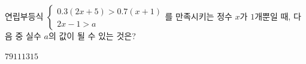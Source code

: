 연립부등식 $\begin{cases} 0.3(2x+5)>0.7(x+1) \\ 2x-1>a \end{cases}$를 만족시키는 정수 $x$가 $1$개뿐일 때, 다음 중 실수 $a$의 값이 될 수 있는 것은?
\begin{choices32}{$7$}{$9$}{$11$}{$13$}{$15$}\end{choices32}
